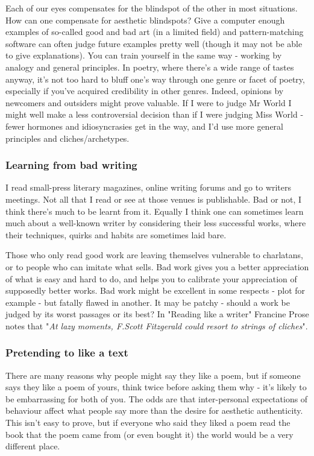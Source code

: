 \documentclass[11pt]{article}
\begin{document}
Each of our eyes compensates for the blindspot of the other in most situations. How can one compensate for aesthetic blindspots? Give a computer enough examples of so-called good and bad art (in a limited field) and pattern-matching software can often judge future examples pretty well (though it may not be able to give explanations). You can train yourself in the same way - working by analogy and general principles. In poetry, where there's a wide range of tastes anyway, it's not too hard to bluff one's way through one genre or facet of poetry, especially if you've acquired credibility in other genres. Indeed, opinions by newcomers and outsiders might prove valuable. If I were to judge Mr World I might well make a less controversial decision than if I were judging Miss World - fewer hormones and idiosyncrasies get in the way, and I'd use more general principles and cliches/archetypes.


\subsubsection*{Learning from bad writing}

I read small-press literary magazines, online writing forums and go to writers meetings. Not all that I read or see at those venues is publishable. Bad or not, I think there's much to be learnt from it. Equally I think one can sometimes learn much about a well-known writer by considering their less successful works, where their techniques, quirks and habits are sometimes laid bare. 


Those who only read good work are leaving themselves vulnerable to charlatans, or to people who can imitate what sells. Bad work gives you a better appreciation of what is easy and hard to do, and helps you to calibrate your appreciation of supposedly better works. Bad work might be excellent in some respects - plot for example - but fatally flawed in another. It may be patchy - should a work be judged by its worst passages or its best? In "Reading like a writer" Francine Prose notes that "\textit{At lazy moments, F.Scott Fitzgerald could resort to strings of cliches}".



\subsubsection*{Pretending to like a text}

There are many reasons why people might say they like a poem, but if someone says they like a poem of yours, think twice before asking them why - it's likely to be embarrassing for both of you. The odds are that inter-personal expectations of behaviour affect what people say more than the desire for aesthetic authenticity. This isn't easy to prove, but if everyone who said they liked a poem read the book that the poem came from (or even bought it) the world would be a very different place.
\end{document}
